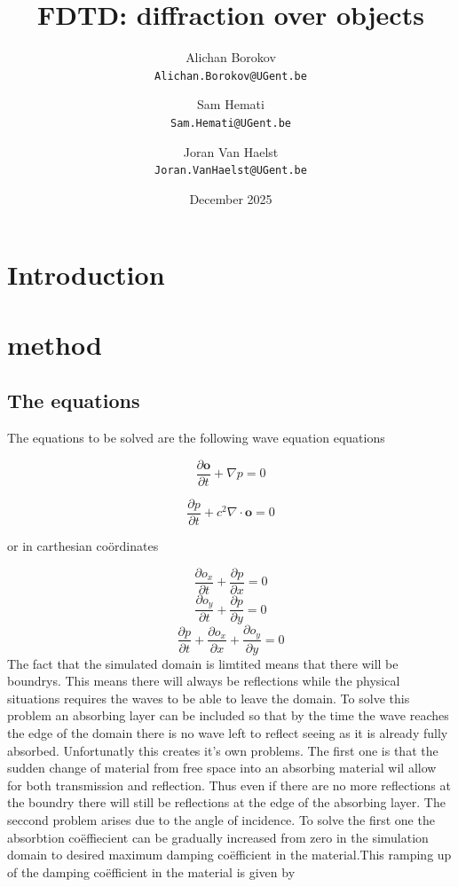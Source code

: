 \documentclass{article}
\title{FDTD: diffraction over objects}
\author{Alichan Borokov \\ \texttt{Alichan.Borokov@UGent.be}
    \and Sam Hemati \\ \texttt{Sam.Hemati@UGent.be}
    \and Joran Van Haelst \\ \texttt{Joran.VanHaelst@UGent.be} }
\date{December 2025}
\begin{document}
\maketitle

\section{Introduction}

\section{method}

\subsection{The equations}
The equations to be solved are the following wave equation equations

\begin{equation}
    \frac{\partial \boldsymbol{o}}{\partial t}+\nabla p=0
\end{equation}

\begin{equation}
    \frac{\partial p}{\partial t}+c^2 \nabla \cdot \boldsymbol{o}=0
\end{equation}

or in carthesian coördinates

\begin{equation}
    \frac{\partial o_x}{\partial t}+\frac{\partial p}{\partial x}=0
\end{equation}
\begin{equation}
    \frac{\partial o_y}{\partial t}+\frac{\partial p}{\partial y}=0
\end{equation}
\begin{equation}
    \frac{\partial p}{\partial t}+\frac{\partial o_x}{\partial x}+ \frac{\partial o_y}{\partial y}=0
\end{equation}
The fact that the simulated domain is limtited means that there will be boundrys. This means there will always be reflections while the physical situations requires the waves to be able to leave the domain. To solve this problem an absorbing layer can be included so that by the time the wave reaches the edge of the domain there is no wave left to reflect seeing as it is already fully absorbed. Unfortunatly this creates it's own problems. The first one is that the sudden change of material from free space into an absorbing material wil allow for both transmission and reflection. Thus even if there are no more reflections at the boundry there will still be reflections at the edge of the absorbing layer. The seccond problem arises due to the angle of incidence. To solve the first one the absorbtion coëffiecient can be gradually increased from zero in the simulation domain to desired maximum damping coëfficient in the material.This ramping up of the damping coëfficient in the material is given by 
\end{document}
